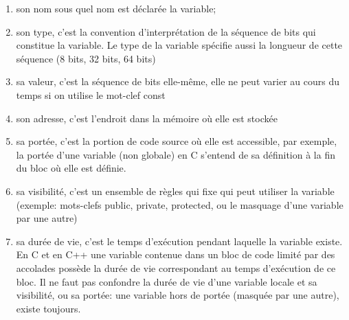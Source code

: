                 \begin{enumerate}\myItemStyle
                    \item son nom \cad sous quel nom est déclarée la variable;
                    \item son type, c'est la convention d'interprétation de la séquence de bits qui constitue la variable. Le type de la variable spécifie aussi la longueur de cette séquence (8 bits, 32 bits, 64 bits)
                    \item sa valeur, c'est la séquence de bits elle-même, elle ne peut varier au cours du temps si on utilise le mot-clef const
                    \item son adresse, c'est l'endroit dans la mémoire où elle est stockée
                    \item sa portée, c'est la portion de code source où elle est accessible, par exemple, la portée d'une variable (non globale) en C s'entend de sa définition à la fin du bloc où elle est définie.
                    \item sa visibilité, c'est un ensemble de règles qui fixe qui peut utiliser la variable (exemple: mots-clefs public, private, protected, ou le masquage d'une variable par une autre)
                    \item sa durée de vie, c'est le temps d'exécution pendant laquelle la variable existe. En C et en C++ une variable contenue dans un bloc de code limité par des accolades \cro{{}} possède la durée de vie correspondant au temps d'exécution de ce bloc. Il ne faut pas confondre la durée de vie d'une variable locale et sa visibilité, ou sa portée: une variable hors de portée (\ie masquée par une autre), existe toujours.
                \end{enumerate}
